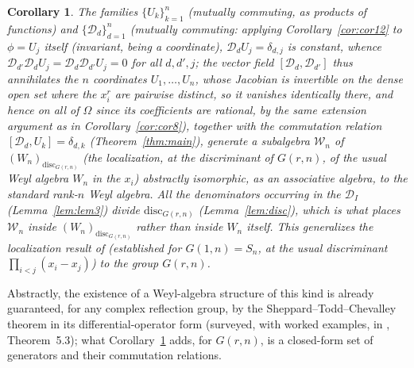 \documentclass[10pt,a4paper]{amsart}
\newtheorem{corollary}[theorem]{Corollary}
\begin{document}
\begin{corollary}\label{cor:weyl}
The families $\{U_k\}_{k=1}^n$ (mutually commuting, as products of functions) and $\{\mathcal D_d\}_{d=1}^n$ (mutually commuting: applying Corollary~\ref{cor:cor12} to $\phi=U_j$ itself (invariant, being a coordinate), $\mathcal D_dU_j=\delta_{d,j}$ is constant, whence $\mathcal D_{d'}\mathcal D_dU_j=\mathcal D_d\mathcal D_{d'}U_j=0$ for all $d,d',j$; the vector field $[\mathcal D_d,\mathcal D_{d'}]$ thus annihilates the $n$ coordinates $U_1,\dots,U_n$, whose Jacobian is invertible on the dense open set where the $x_i^r$ are pairwise distinct, so it vanishes identically there, and hence on all of $\Omega$ since its coefficients are rational, by the same extension argument as in Corollary~\ref{cor:cor8}), together with the commutation relation $[\mathcal D_d,U_k]=\delta_{d,k}$ (Theorem~\ref{thm:main}), generate a subalgebra $\mathcal W_n$ of $(W_n)_{\mathrm{disc}_{G(r,n)}}$ (the localization, at the discriminant of $G(r,n)$, of the usual Weyl algebra $W_n$ in the $x_i$) abstractly isomorphic, as an associative algebra, to the standard rank-$n$ Weyl algebra. All the denominators occurring in the $\mathcal D_I$ (Lemma~\ref{lem:lem3}) divide $\mathrm{disc}_{G(r,n)}$ (Lemma~\ref{lem:disc}), which is what places $\mathcal W_n$ inside $(W_n)_{\mathrm{disc}_{G(r,n)}}$ rather than inside $W_n$ itself. This generalizes the localization result of \cite{N} (established for $G(1,n)=S_n$, at the usual discriminant $\prod_{i<j}(x_i-x_j)$) to the group $G(r,n)$.
\end{corollary}

Abstractly, the existence of a Weyl-algebra structure of this kind is already guaranteed, for any complex reflection group, by the Sheppard--Todd--Chevalley theorem in its differential-operator form (surveyed, with worked examples, in \cite{Tr}, Theorem~5.3); what Corollary~\ref{cor:weyl} adds, for $G(r,n)$, is a closed-form set of generators and their commutation relations.
\end{document}
